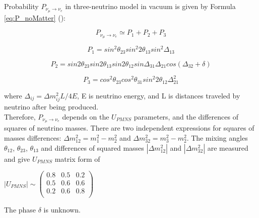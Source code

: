 Probability $P_{\nu_\mu \rightarrow \nu_e}$ in three-neutrino model in vacuum is given by Formula \ref{eq:P_noMatter} (\cite{ref_theory_Osc}): \\
\begin{center}

\begin{equation}
\label{eq:P_noMatter}
P_{\nu_\mu \rightarrow \nu_e} \simeq P_1 + P_2 + P_3 
\end{equation}

\begin{equation}
\label{eq:P_noMatter_1}
P_1 = sin^2{\theta_{23}}sin^2{2\theta_{13}}sin^2{\Delta_{13}}
\end{equation}

\begin{equation}
\label{eq:P_noMatter_2}
P_2 = sin2\theta_{23}sin2\theta_{13}sin2\theta_{12}sin{\Delta_{31}}\Delta_{21}cos(\Delta_{32}+\delta)
\end{equation}

\begin{equation}
\label{eq:P_noMatter_3}
P_3 = cos^2\theta_{23}cos^2\theta_{31}sin^2{2\theta_{12}}\Delta^2_{21}
\end{equation}

\end{center}

where $\Delta_{ij}={\Delta}m^2_{ij}L/4E$, E is neutrino energy, and L is distances traveled by neutrino after being produced.\\

Therefore, $P_{\nu_\mu \rightarrow \nu_e}$ depends on the $U_{PMNS}$ parameters, and the differences of squares of neutrino masses. There are two independent expressions for squares of masses differences: ${\Delta}m_{12}^2 = m_1^2-m_2^2$ and ${\Delta}m_{32}^2 = m_3^2-m_2^2$. The mixing angles $\theta_{12}$, $\theta_{23}$, $\theta_{13}$ and differences of squared masses $|{\Delta}m_{12}^2|$ and $|{\Delta}m_{32}^2|$ are measured and give $U_{PMNS}$ matrix form of\\
\begin{center}
$|U_{PMNS}| \sim
 \begin{pmatrix}
  0.8 & 0.5 & 0.2 \\ 0.5 & 0.6 & 0.6 \\ 0.2 & 0.6 & 0.8 \\
 \end{pmatrix}$\\
\end{center}

The phase $\delta$ is unknown.\\

